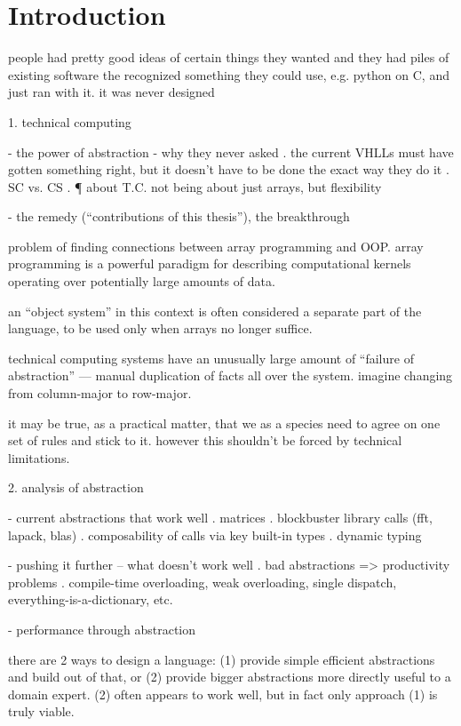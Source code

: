 \chapter{Introduction}

people had pretty good ideas of certain things they wanted
and they had piles of existing software
the recognized something they could use, e.g. python on C, and just ran
with it. it was never designed


1. technical computing

- the power of abstraction
- why they never asked
  . the current VHLLs must have gotten something right, but it doesn't have
    to be done the exact way they do it
  . SC vs. CS
  . ¶ about T.C. not being about just arrays, but flexibility

- the remedy (``contributions of this thesis''), the breakthrough

problem of finding connections between array programming and OOP.
array programming is a powerful paradigm for describing computational
kernels operating over potentially large amounts of data.

an ``object system'' in this context is often considered a separate
part of the language, to be used only when arrays no longer
suffice.

technical computing systems have an unusually large amount of
``failure of abstraction'' --- manual duplication of facts
all over the system. imagine changing from column-major to
row-major.

it may be true, as a practical matter, that we as a species need to agree on
one set of rules and stick to it. however this shouldn't be forced by
technical limitations.


2. analysis of abstraction

- current abstractions that work well
  . matrices
  . blockbuster library calls (fft, lapack, blas)
  . composability of calls via key built-in types
  . dynamic typing

- pushing it further -- what doesn't work well
  . bad abstractions => productivity problems
  . compile-time overloading, weak overloading, single dispatch,
    everything-is-a-dictionary, etc.

- performance through abstraction

there are 2 ways to design a language: (1) provide simple efficient abstractions
and build out of that, or (2) provide bigger abstractions more directly useful
to a domain expert. (2) often appears to work well, but in fact only approach
(1) is truly viable.

